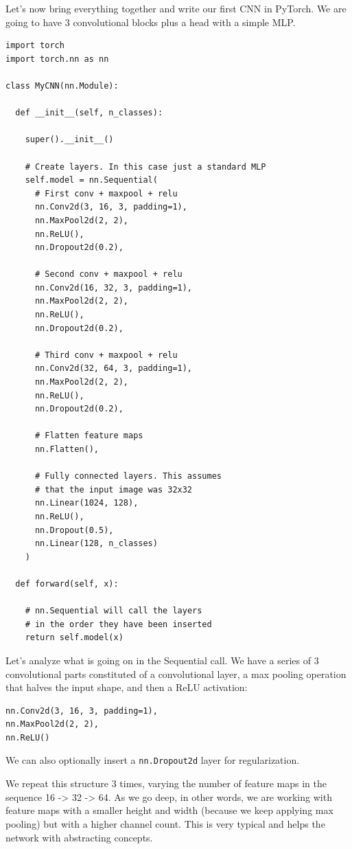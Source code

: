Let's now bring everything together and write our first CNN in PyTorch. We are going to have 3 convolutional blocks plus a head with a simple MLP.
\begin{lstlisting}
import torch
import torch.nn as nn

class MyCNN(nn.Module):

  def __init__(self, n_classes):

    super().__init__()

    # Create layers. In this case just a standard MLP
    self.model = nn.Sequential(
      # First conv + maxpool + relu
      nn.Conv2d(3, 16, 3, padding=1),
      nn.MaxPool2d(2, 2),
      nn.ReLU(),
      nn.Dropout2d(0.2),

      # Second conv + maxpool + relu
      nn.Conv2d(16, 32, 3, padding=1),
      nn.MaxPool2d(2, 2),
      nn.ReLU(),
      nn.Dropout2d(0.2),

      # Third conv + maxpool + relu
      nn.Conv2d(32, 64, 3, padding=1),
      nn.MaxPool2d(2, 2),
      nn.ReLU(),
      nn.Dropout2d(0.2),

      # Flatten feature maps
      nn.Flatten(),

      # Fully connected layers. This assumes
      # that the input image was 32x32
      nn.Linear(1024, 128),
      nn.ReLU(),
      nn.Dropout(0.5),
      nn.Linear(128, n_classes)
    )

  def forward(self, x):

    # nn.Sequential will call the layers 
    # in the order they have been inserted
    return self.model(x)
\end{lstlisting}
Let's analyze what is going on in the Sequential call. We have a series of 3 convolutional parts constituted of a convolutional layer, a max pooling operation that halves the input shape, and then a ReLU activation:
\begin{lstlisting}
nn.Conv2d(3, 16, 3, padding=1),
nn.MaxPool2d(2, 2),
nn.ReLU()
\end{lstlisting}
We can also optionally insert a \lstinline{nn.Dropout2d} layer for regularization. \newline

We repeat this structure 3 times, varying the number of feature maps in the sequence 16 -> 32 -> 64. As we go deep, in other words, we are working with feature maps with a smaller height and width (because we keep applying max pooling) but with a higher channel count. This is very typical and helps the network with abstracting concepts.\newline


